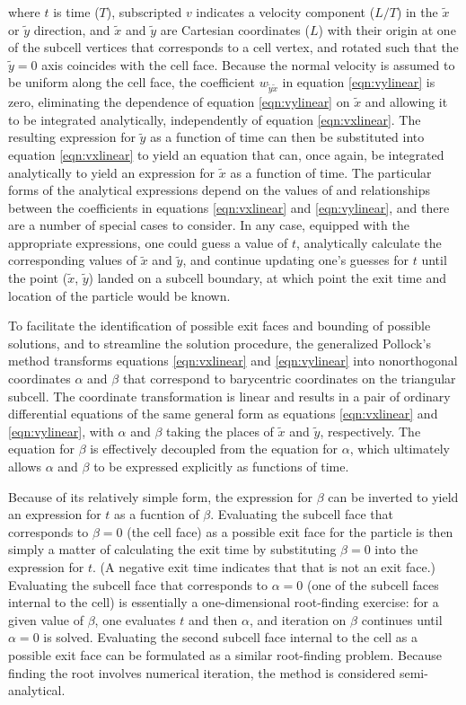 \noindent where $t$ is time ($T$), subscripted $v$ indicates a velocity component ($L/T$) in the $\tilde{x}$ or $\tilde{y}$ direction, and $\tilde{x}$ and $\tilde{y}$ are Cartesian coordinates ($L$) with their origin at one of the subcell vertices that corresponds to a cell vertex, and rotated such that the $\tilde{y} = 0$ axis coincides with the cell face. Because the normal velocity is assumed to be uniform along the cell face, the coefficient $w_{\tilde{y} \tilde{x}}$ in equation \ref{eqn:vylinear} is zero, eliminating the dependence of equation \ref{eqn:vylinear} on $\tilde{x}$ and allowing it to be integrated analytically, independently of equation \ref{eqn:vxlinear}. The resulting expression for $\tilde{y}$ as a function of time can then be substituted into equation \ref{eqn:vxlinear} to yield an equation that can, once again, be integrated analytically to yield an expression for $\tilde{x}$ as a function of time. The particular forms of the analytical expressions depend on the values of and relationships between the coefficients in equations \ref{eqn:vxlinear} and \ref{eqn:vylinear}, and there are a number of special cases to consider. In any case, equipped with the appropriate expressions, one could guess a value of $t$, analytically calculate the corresponding values of $\tilde{x}$ and $\tilde{y}$, and continue updating one's guesses for $t$ until the point ($\tilde{x}$, $\tilde{y}$) landed on a subcell boundary, at which point the exit time and location of the particle would be known.

To facilitate the identification of possible exit faces and bounding of possible solutions, and to streamline the solution procedure, the generalized Pollock's method transforms equations \ref{eqn:vxlinear} and \ref{eqn:vylinear} into nonorthogonal coordinates $\alpha$ and $\beta$ that correspond to barycentric coordinates on the triangular subcell. The coordinate transformation is linear and results in a pair of ordinary differential equations of the same general form as equations \ref{eqn:vxlinear} and \ref{eqn:vylinear}, with $\alpha$ and $\beta$ taking the places of $\tilde{x}$ and $\tilde{y}$, respectively. The equation for $\beta$ is effectively decoupled from the equation for $\alpha$, which ultimately allows $\alpha$ and $\beta$ to be expressed explicitly as functions of time.

Because of its relatively simple form, the expression for $\beta$ can be inverted to yield an expression for $t$ as a fucntion of $\beta$. Evaluating the subcell face that corresponds to $\beta = 0$ (the cell face) as a possible exit face for the particle is then simply a matter of calculating the exit time by substituting $\beta = 0$ into the expression for $t$. (A negative exit time indicates that that is not an exit face.) Evaluating the subcell face that corresponds to $\alpha = 0$ (one of the subcell faces internal to the cell) is essentially a one-dimensional root-finding exercise: for a given value of $\beta$, one evaluates $t$ and then $\alpha$, and iteration on $\beta$ continues until $\alpha = 0$ is solved. Evaluating the second subcell face internal to the cell as a possible exit face can be formulated as a similar root-finding problem. Because finding the root involves numerical iteration, the method is considered semi-analytical.

